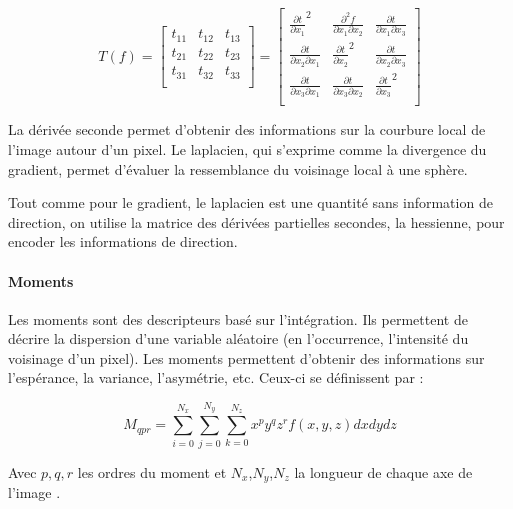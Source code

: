 \begin{equation}
T(f) =
\begin{bmatrix}
t_{11} & t_{12} & t_{13} \\
t_{21} & t_{22} & t_{23} \\
t_{31} & t_{32} & t_{33} \\
\end{bmatrix}
  =
\begin{bmatrix}
{\frac{\partial t}{\partial x_1}}^2 & \frac{\partial^2 f}{\partial x_1 \partial x_2} & \frac{\partial t}{\partial x_1 \partial x_3} \\
\frac{\partial t}{\partial x_2 \partial x_1} & {\frac{\partial t}{\partial x_2}}^2 & \frac{\partial t}{\partial x_2 \partial x_3} \\
\frac{\partial t}{\partial x_3 \partial x_1} & \frac{\partial t}{\partial x_3 \partial x_2} & {\frac{\partial t}{\partial x_3}}^2 \\
\end{bmatrix}
\nonumber
\end{equation}

La dérivée seconde permet d'obtenir des informations sur la courbure local de l'image autour d'un pixel. Le laplacien, qui s'exprime comme la divergence du gradient, permet d'évaluer la ressemblance du voisinage local à une sphère. \cite{Wang2020_tensor_cut}

Tout comme pour le gradient, le laplacien est une quantité sans information de direction, on utilise la matrice des dérivées partielles secondes, la hessienne, pour encoder les informations de direction.

\paragraph{Moments}

Les moments sont des descripteurs basé sur l'intégration. Ils permettent de décrire la dispersion d'une variable aléatoire (en l'occurrence, l'intensité du voisinage d'un pixel). Les moments permettent d'obtenir des informations sur l'espérance, la variance, l'asymétrie, etc. Ceux-ci se définissent par :

\begin{equation}
  M_{qpr}= \sum_{i=0}^{N_x}\sum_{j=0}^{N_y}\sum_{k=0}^{N_z}x^py^qz^r f(x,y,z) dxdydz
\end{equation}

Avec $p,q,r$ les ordres du moment et $N_x$,$N_y$,$N_z$ la longueur de chaque axe de l'image
.


